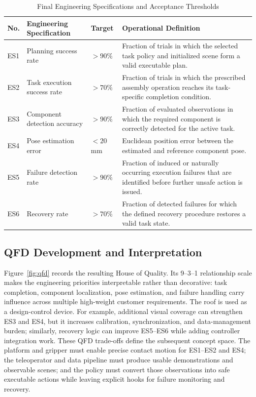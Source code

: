 \documentclass[12pt, letterpaper]{article}
\begin{document}
\begin{table}[H]
\centering
\caption{Final Engineering Specifications and Acceptance Thresholds}
\label{tab:es}
\small
 \begin{tabularx}{\textwidth}{
  >{\centering\arraybackslash}p{}
  p{}
  >{\centering\arraybackslash}p{}
  X}
\toprule
\textbf{No.} & \textbf{Engineering Specification} & \textbf{Target} & \textbf{Operational Definition} \\
\midrule
ES1 & Planning success rate & $>90\%$ & Fraction of trials in which the selected task policy and initialized scene form a valid executable plan. \\
ES2 & Task execution success rate & $>70\%$ & Fraction of trials in which the prescribed assembly operation reaches its task-specific completion condition. \\
ES3 & Component detection accuracy & $>90\%$ & Fraction of evaluated observations in which the required component is correctly detected for the active task. \\
ES4 & Pose estimation error & $<20$\,mm & Euclidean position error between the estimated and reference component pose. \\
ES5 & Failure detection rate & $>90\%$ & Fraction of induced or naturally occurring execution failures that are identified before further unsafe action is issued. \\
ES6 & Recovery rate & $>70\%$ & Fraction of detected failures for which the defined recovery procedure restores a valid task state. \\
\bottomrule
\end{tabularx}
\end{table}

\subsection{QFD Development and Interpretation}

Figure~\ref{fig:qfd} records the resulting House of Quality. Its 9--3--1 relationship scale makes the engineering priorities interpretable rather than decorative: task completion, component localization, pose estimation, and failure handling carry influence across multiple high-weight customer requirements. The roof is used as a design-control device. For example, additional visual coverage can strengthen ES3 and ES4, but it increases calibration, synchronization, and data-management burden; similarly, recovery logic can improve ES5--ES6 while adding controller integration work. These QFD trade-offs define the subsequent concept space. The platform and gripper must enable precise contact motion for ES1--ES2 and ES4; the teleoperator and data pipeline must produce usable demonstrations and observable scenes; and the policy must convert those observations into safe executable actions while leaving explicit hooks for failure monitoring and recovery.
\end{document}
